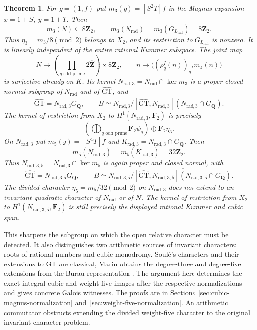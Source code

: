 \documentclass[11pt,a4paper]{article}
\newtheorem{theorem}{Theorem}[section]
\theoremstyle{definition}
\theoremstyle{remark}
\newcommand{\GT}{\widehat{\mathrm{GT}}}
\newcommand{\Zh}{\widehat{\mathbf Z}}
\newcommand{\Z}{\mathbf Z}
\newcommand{\Q}{\mathbf Q}
\newcommand{\F}{\mathbf F}
\newcommand{\GQ}{G_{\Q}}
\begin{document}
\begin{theorem}\label{thm:main-cubic-normalization}
For $g=(1,f)$ put $m_3(g)=[S^2T]f$ in the Magnus expansion
$x=1+S$, $y=1+T$.  Then
\[
 m_3(N)\subseteq8\Z_2,\qquad
 m_3(N_{\mathrm{rad}})=m_3(G_{L_{\mathrm{rad}}})=8\Z_2.
\]
Thus $\eta_3=m_3/8\pmod2$ belongs to $X_2$, and its restriction
to $G_{L_{\mathrm{rad}}}$ is nonzero.  It is linearly independent
of the entire rational Kummer subspace.  The joint map
\[
 N\longrightarrow
 \left(\prod_{q\text{ odd prime}}2\Zh\right)\times8\Z_2,
 \qquad n\longmapsto\bigl((\rho_q^I(n))_q,m_3(n)\bigr)
\]
is surjective already on $K$.  Its kernel
$N_{\mathrm{rad},3}=N_{\mathrm{rad}}\cap\ker m_3$ is a proper
closed normal subgroup of $N_{\mathrm{rad}}$ and of $\GT$, and
\[
 \GT=N_{\mathrm{rad},3}\GQ,\qquad
 B\simeq N_{\mathrm{rad},3}/
 \overline{[\GT,N_{\mathrm{rad},3}]
                 (N_{\mathrm{rad},3}\cap\GQ)}.
\]
The kernel of restriction from $X_2$ to
$H^1(N_{\mathrm{rad},3},\F_2)$ is precisely
\[
 \left(\bigoplus_{q\text{ odd prime}}\F_2\psi_q\right)
       \oplus\F_2\eta_3.
\]
On $N_{\mathrm{rad},3}$ put $m_5(g)=[S^4T]f$ and
$K_{\mathrm{rad},3}=N_{\mathrm{rad},3}\cap\GQ$.  Then
\[
 m_5(N_{\mathrm{rad},3})=m_5(K_{\mathrm{rad},3})=32\Z_2.
\]
Thus $N_{\mathrm{rad},3,5}=N_{\mathrm{rad},3}\cap\ker m_5$
is again proper and closed normal, with
\[
 \GT=N_{\mathrm{rad},3,5}\GQ,\qquad
 B\simeq N_{\mathrm{rad},3,5}/
 \overline{[\GT,N_{\mathrm{rad},3,5}]
                  (N_{\mathrm{rad},3,5}\cap\GQ)}.
\]
The divided character $\eta_5=m_5/32\pmod2$ on
$N_{\mathrm{rad},3}$ does not extend to an invariant quadratic
character of $N_{\mathrm{rad}}$ or of $N$.  The kernel of restriction
from $X_2$ to $H^1(N_{\mathrm{rad},3,5},\F_2)$ is still precisely
the displayed rational Kummer and cubic span.
\end{theorem}

This sharpens the subgroup on which the open relative character must
be detected.  It also distinguishes two arithmetic sources of invariant
characters: roots of rational numbers and cubic monodromy.
Soul\'e's characters and their extensions to GT are classical;
Marin obtains the degree-three and degree-five extensions from the
Burau representation \cite[\S6.3, p.~780]{Marin2008}.
The argument here determines the exact integral cubic and weight-five
images after the respective normalizations and gives concrete Galois witnesses.
The proofs are in Sections~\ref{sec:cubic-magnus-normalization}
and~\ref{sec:weight-five-normalization}.  An arithmetic commutator
obstructs extending the divided weight-five character to the original
invariant character problem.
\end{document}
